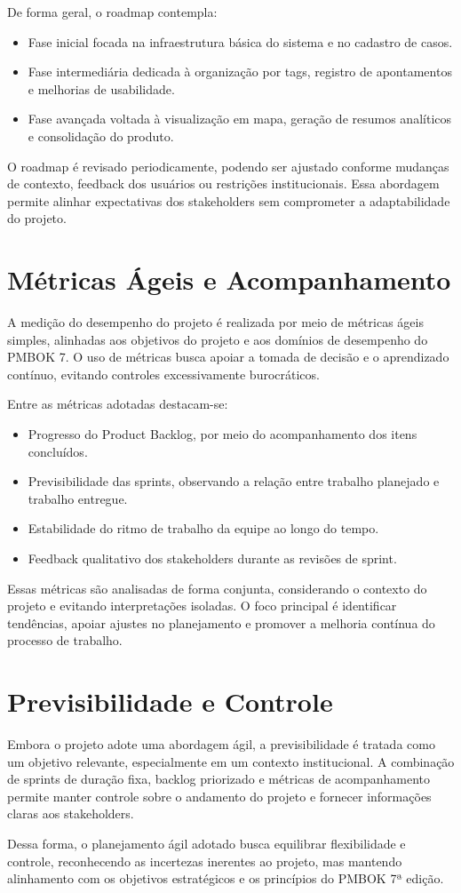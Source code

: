 De forma geral, o roadmap contempla:
\begin{itemize}
    \item Fase inicial focada na infraestrutura básica do sistema e no cadastro de casos.
    \item Fase intermediária dedicada à organização por tags, registro de apontamentos e melhorias de usabilidade.
    \item Fase avançada voltada à visualização em mapa, geração de resumos analíticos e consolidação do produto.
\end{itemize}

O roadmap é revisado periodicamente, podendo ser ajustado conforme mudanças de contexto, feedback dos usuários ou restrições institucionais. Essa abordagem permite alinhar expectativas dos stakeholders sem comprometer a adaptabilidade do projeto.

\section{Métricas Ágeis e Acompanhamento}

A medição do desempenho do projeto é realizada por meio de métricas ágeis simples, alinhadas aos objetivos do projeto e aos domínios de desempenho do PMBOK 7. O uso de métricas busca apoiar a tomada de decisão e o aprendizado contínuo, evitando controles excessivamente burocráticos.

Entre as métricas adotadas destacam-se:
\begin{itemize}
    \item Progresso do Product Backlog, por meio do acompanhamento dos itens concluídos.
    \item Previsibilidade das sprints, observando a relação entre trabalho planejado e trabalho entregue.
    \item Estabilidade do ritmo de trabalho da equipe ao longo do tempo.
    \item Feedback qualitativo dos stakeholders durante as revisões de sprint.
\end{itemize}

Essas métricas são analisadas de forma conjunta, considerando o contexto do projeto e evitando interpretações isoladas. O foco principal é identificar tendências, apoiar ajustes no planejamento e promover a melhoria contínua do processo de trabalho.

\section{Previsibilidade e Controle}

Embora o projeto adote uma abordagem ágil, a previsibilidade é tratada como um objetivo relevante, especialmente em um contexto institucional. A combinação de sprints de duração fixa, backlog priorizado e métricas de acompanhamento permite manter controle sobre o andamento do projeto e fornecer informações claras aos stakeholders.

Dessa forma, o planejamento ágil adotado busca equilibrar flexibilidade e controle, reconhecendo as incertezas inerentes ao projeto, mas mantendo alinhamento com os objetivos estratégicos e os princípios do PMBOK 7ª edição.
